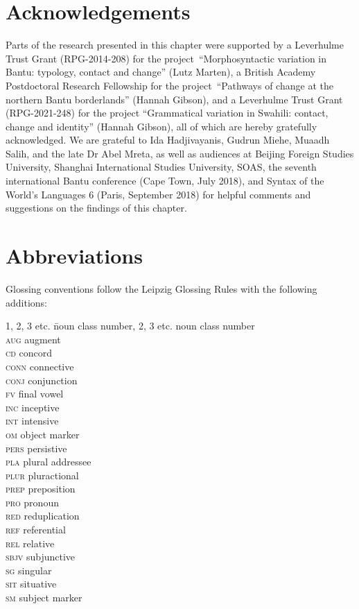 \documentclass[output=paper]{langscibook}
\begin{document}
\section*{Acknowledgements}

Parts of the research presented in this chapter were supported by a Leverhulme Trust Grant (RPG-2014-208) for the project~``Morphosyntactic variation in Bantu: typology, contact and change'' (Lutz Marten), a British Academy Postdoctoral Research Fellowship  for the project~``Pathways of change at the northern Bantu borderlands'' (Hannah Gibson), and a Leverhulme Trust Grant (RPG-2021-248) for the project ``Grammatical variation in Swahili: contact, change and identity'' (Hannah Gibson), all of which are hereby gratefully acknowledged. We are grateful to Ida Hadjivayanis, Gudrun Miehe, Muaadh Salih, and the late Dr Abel Mreta, as well as audiences at Beijing Foreign Studies University, Shanghai International Studies University, SOAS, the seventh international Bantu conference (Cape Town, July 2018), and Syntax of the World’s Languages 6 (Paris, September 2018) for helpful comments and suggestions on the findings of this chapter. 

\section*{Abbreviations}

Glossing conventions follow the Leipzig Glossing Rules with the following additions: 
\begin{multicols}{2}
\begin{tabbing}
1, 2, 3 etc. \= noun class number, 2, 3 etc. \> noun class number\\
\textsc{aug} \> augment\\
\textsc{cd} \> concord\\
\textsc{conn} \> connective\\
\textsc{conj} \> conjunction\\
\textsc{fv} \> final vowel\\
\textsc{inc} \> inceptive\\
\textsc{int} \> intensive\\
\textsc{om} \> object marker\\
\textsc{pers} \> persistive\\
\textsc{pla} \> plural addressee\\
\textsc{plur} \> pluractional\\
\textsc{prep} \> preposition\\
\textsc{pro} \> pronoun\\
\textsc{red} \> reduplication\\
\textsc{ref} \> referential\\
\textsc{rel} \> relative\\
\textsc{sbjv} \> subjunctive\\
\textsc{sg} \> singular\\
\textsc{sit} \> situative\\
\textsc{sm} \> subject marker\\  
\end{tabbing}
\end{multicols}


\sloppy\printbibliography[heading=subbibliography,notkeyword=this]
\end{document}
